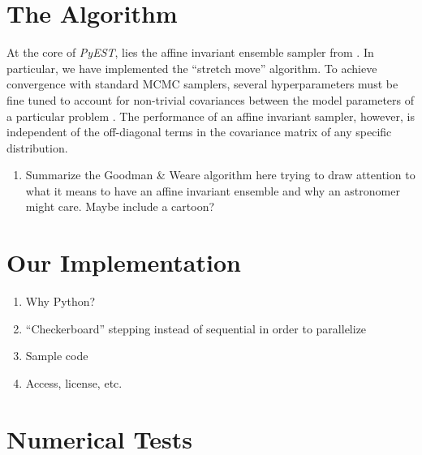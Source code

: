 \documentclass[12pt,preprint]{aastex}
\newcommand{\project}[1]{\textsl{#1}}
\newcommand{\this}{\project{PyEST}}
\begin{document}
\section{The Algorithm}

\citet{Hou:2011}

At the core of \this , lies the affine invariant ensemble sampler from
\citep{Goodman:2010}.  In particular, we have implemented the ``stretch move''
algorithm.  To achieve convergence with standard MCMC samplers, several
hyperparameters must be fine tuned to account for non-trivial covariances between
the model parameters of a particular problem \citep[e.g.][]{Dunkley:2005}.
The performance of an affine invariant sampler, however, is independent of the
off-diagonal terms in the covariance matrix of any specific distribution.

\begin{enumerate}

    \item Summarize the Goodman \& Weare algorithm here trying to draw attention
        to what it means to have an affine invariant ensemble and why an astronomer
        might care. Maybe include a cartoon?

\end{enumerate}

\section{Our Implementation}

\begin{enumerate}

    \item Why Python?

    \item ``Checkerboard'' stepping instead of sequential in order to parallelize

    \item Sample code

    \item Access, license, etc.

\end{enumerate}

\section{Numerical Tests}
\end{document}
